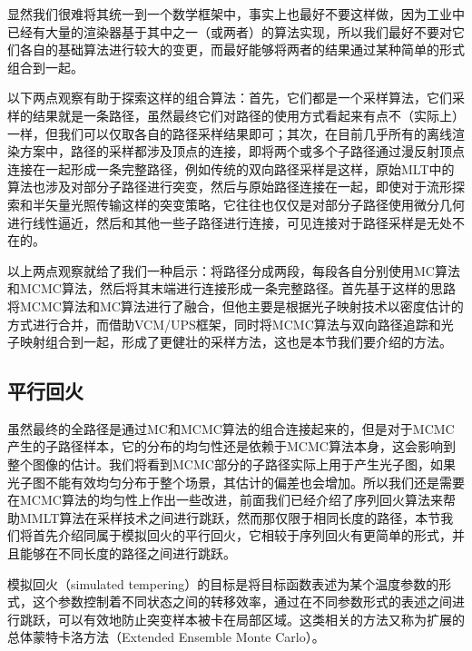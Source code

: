 显然我们很难将其统一到一个数学框架中，事实上也最好不要这样做，因为工业中已经有大量的渲染器基于其中之一（或两者）的算法实现，所以我们最好不要对它们各自的基础算法进行较大的变更，而最好能够将两者的结果通过某种简单的形式组合到一起。

以下两点观察有助于探索这样的组合算法：首先，它们都是一个采样算法，它们采样的结果就是一条路径，虽然最终它们对路径的使用方式看起来有点不（实际上）一样，但我们可以仅取各自的路径采样结果即可；其次，在目前几乎所有的离线渲染方案中，路径的采样都涉及顶点的连接，即将两个或多个子路径通过漫反射顶点连接在一起形成一条完整路径，例如传统的双向路径采样是这样，原始MLT中的算法也涉及对部分子路径进行突变，然后与原始路径连接在一起，即使对于流形探索和半矢量光照传输这样的突变策略，它往往也仅仅是对部分子路径使用微分几何进行线性逼近，然后和其他一些子路径进行连接，可见连接对于路径采样是无处不在的。

以上两点观察就给了我们一种启示：将路径分成两段，每段各自分别使用MC算法和MCMC算法，然后将其末端进行连接形成一条完整路径。\cite{a:RobustAdaptivePhotonTracingusingPhotonPathVisibility}首先基于这样的思路将MCMC算法和MC算法进行了融合，但他主要是根据光子映射技术以密度估计的方式进行合并，而借助VCM/UPS框架，\cite{a:RobustLightTransportSimulationviaMetropolisedBidirectionalEstimators}同时将MCMC算法与双向路径追踪和光子映射组合到一起，形成了更健壮的采样方法，这也是本节我们要介绍的方法。





\subsection{平行回火}
虽然最终的全路径是通过MC和MCMC算法的组合连接起来的，但是对于MCMC产生的子路径样本，它的分布的均匀性还是依赖于MCMC算法本身，这会影响到整个图像的估计。我们将看到MCMC部分的子路径实际上用于产生光子图，如果光子图不能有效均匀分布于整个场景，其估计的偏差也会增加。所以我们还是需要在MCMC算法的均匀性上作出一些改进，前面我们已经介绍了序列回火算法来帮助MMLT算法在采样技术之间进行跳跃，然而那仅限于相同长度的路径，本节我们将首先介绍同属于模拟回火的平行回火，它相较于序列回火有更简单的形式，并且能够在不同长度的路径之间进行跳跃。

模拟回火（simulated tempering）的目标是将目标函数表述为某个温度参数的形式，这个参数控制着不同状态之间的转移效率，通过在不同参数形式的表述之间进行跳跃，可以有效地防止突变样本被卡在局部区域。这类相关的方法又称为扩展的总体蒙特卡洛方法（Extended Ensemble Monte Carlo）\cite{a:ExtendedEnsembleMonteCarlo}。

